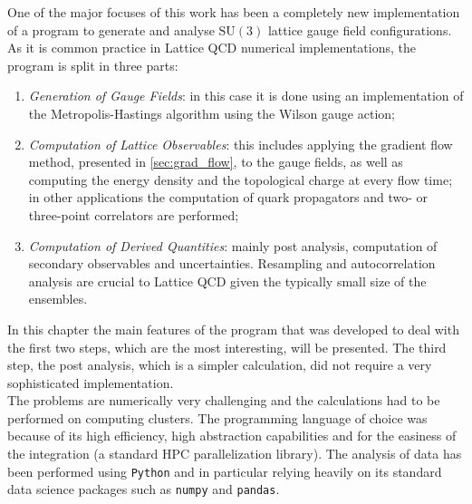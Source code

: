One of the major focuses of this work has been a completely new implementation of a program to generate and analyse $\mathrm{SU}(3)$ lattice gauge field configurations. As it is common practice in Lattice QCD numerical implementations, the program is split in three parts:
\begin{enumerate}
    \item \textit{Generation of Gauge Fields}: in this case it is done using an implementation of the Metropolis-Hastings algorithm using the Wilson gauge action;
    \item \textit{Computation of Lattice Observables}: this includes applying the gradient flow method, presented in \cref{sec:grad_flow}, to the gauge fields, as well as computing the energy density and the topological charge at every flow time; in other applications the computation of quark propagators and two- or three-point correlators are performed; 
    \item \textit{Computation of Derived Quantities}: mainly post analysis, computation of secondary observables and uncertainties. Resampling and autocorrelation analysis are crucial to Lattice QCD given the typically small size of the ensembles. 
\end{enumerate}
In this chapter the main features of the program that was developed to deal with the first two steps, which are the most interesting, will be presented. The third step, the post analysis, which is a simpler calculation, did not require a very sophisticated implementation. \\
The problems are numerically very challenging and the calculations had to be performed on computing clusters. The programming language of choice was \cpp because of its high efficiency, high abstraction capabilities and for the easiness of the \mpi integration (a standard HPC parallelization library). The analysis of data has been performed using \texttt{Python} and in particular relying heavily on its standard data science packages such as \texttt{numpy} and \texttt{pandas}.
  
